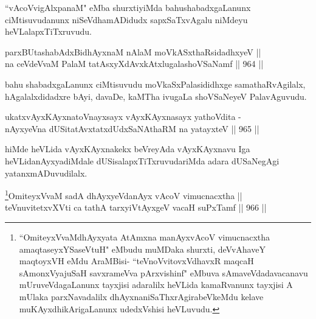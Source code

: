 \begin{artha}
``vAcoVvigAlxpanaM" eMba shurxtiyiMda bahushabadxgaLanunx ciMtisuvudanunx niSeVdhamADidudx sapxSaTxvAgalu niMdeyu heVLalapxTiTxruvudu.
\end{artha}


\begin{shl}
parxBUtashabAdxBidhAyxnaM nAlaM moVkASxthaRsidadhxyeV || \\
na ceVdeVvaM PalaM tatAsxyXdAvxkAtxlugalashoVSaNamf \hfill || 964 ||  
\end{shl}	

\begin{artha}
bahu shabadxgaLanunx ciMtisuvudu moVkaSxPalasididhxge samathaRvAgilalx, hAgalalxdidadxre bAyi, davaDe, kaMTha ivugaLa shoVSaNeyeV PalavAguvudu.
\end{artha}


\begin{shl}
ukatxvAyxKAyxnatoV\s nayxsayx vAyxKAyxnasayx yathoVdita - \\
nAyxyeVna dUSitatAvxtatxdUdxSaNAthaRM na yatayxteV \hfill || 965 ||  
\end{shl}

\begin{artha}
hiMde heVLida vAyxKAyxnakekx beVreyAda vAyxKAyxnavu Iga heVLida\footnotemark[2] nAyxyadiMdale dUSisalapxTiTxruvudariMda adara dUSaNegAgi yatanxmADuvudilalx.
\end{artha}



\begin{shl}
\footnote{``OmiteyxVvaMdhAyxyata AtAmxna manAyxvAcoV vimucnacxtha amaqtaseyxYSaseVtuH" eMbudu muMDaka shurxti, deVvAhaveY maqtoyxVH eMdu AraMBisi- ``teVnoVvitovxVdhavxR maqcaH sAmonxVyajuSaH savxrameVva pArxvishinf" eMbuva sAmaveVdadavacanavu mUruveVdagaLanunx tayxjisi adaralilx heVLida kamaRvanunx tayxjisi A mUlaka parxNavadalilx dhAyxnaniSaThxrAgirabeVkeMdu kelave muKAyxdhikArigaLanunx udedxVshisi heVLuvudu.}OmiteyxVvaM sadA dhAyxyeVdanAyx vAcoV vimucnacxtha || \\
teV\s nuvitetxvXVti ca tathA tarxyiVtAyxgeV vacaH suPxTamf \hfill || 966 ||  
\end{shl}

